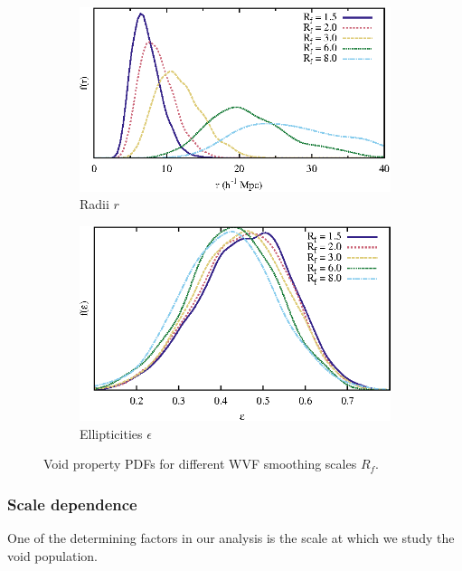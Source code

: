 \begin{figure}
  \begin{subfigure}[b]{\textwidth}
    \centering
    \includegraphics[width=\textwidth]{ch_voidsde/img/radii_filterRadii}
    \caption{Radii $r$}
    \label{fig:radii_filterRadii}
  \end{subfigure}
  \begin{subfigure}[b]{\textwidth}
    \centering
    \includegraphics[width=\textwidth]{ch_voidsde/img/ell_filterRadii}
    \caption{Ellipticities $\epsilon$}
    \label{fig:ell_filterRadii}
  \end{subfigure}
	\caption{Void property PDFs for different WVF smoothing scales $R_f$.}
	\label{fig:filterRadii}
\end{figure}

\subsubsection{Scale dependence}
One of the determining factors in our analysis is the scale at which we study the void population. 


